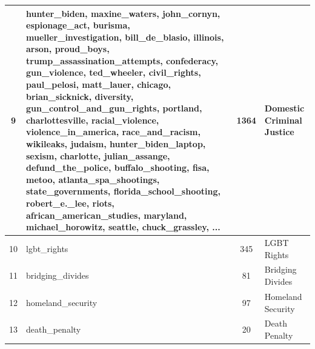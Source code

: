 \begin{tiny}
\begin{longtable}{c p{} c p{}}
9 & hunter\_biden, maxine\_waters, john\_cornyn, espionage\_act, burisma, mueller\_investigation, bill\_de\_blasio, illinois, arson, proud\_boys, trump\_assassination\_attempts, confederacy, gun\_violence, ted\_wheeler, civil\_rights, paul\_pelosi, matt\_lauer, chicago, brian\_sicknick, diversity, gun\_control\_and\_gun\_rights, portland, charlottesville, racial\_violence, violence\_in\_america, race\_and\_racism, wikileaks, judaism, hunter\_biden\_laptop, sexism, charlotte, julian\_assange, defund\_the\_police, buffalo\_shooting, fisa, metoo, atlanta\_spa\_shootings, state\_governments, florida\_school\_shooting, robert\_e.\_lee, riots, african\_american\_studies, maryland, michael\_horowitz, seattle, chuck\_grassley, ... & 1364 & Domestic Criminal Justice \\
\midrule

10 & lgbt\_rights & 345 & LGBT Rights \\
\midrule

11 & bridging\_divides & 81 & Bridging Divides \\
\midrule

12 & homeland\_security & 97 & Homeland Security \\
\midrule

13 & death\_penalty & 20 & Death Penalty \\

\end{longtable}
\end{tiny}
